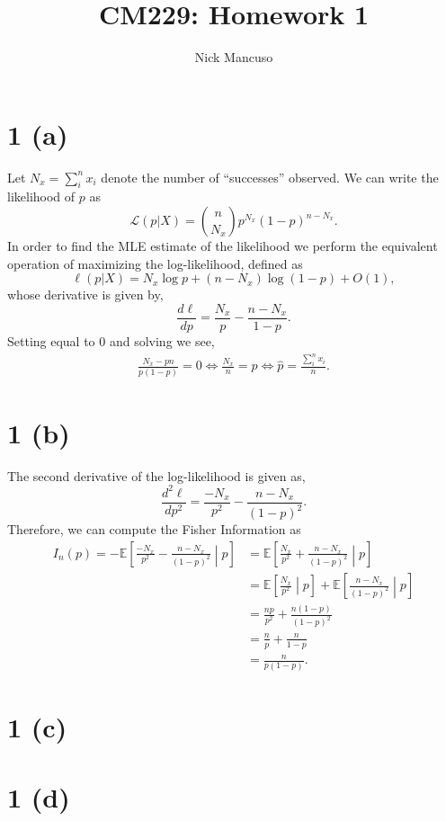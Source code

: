 \documentclass[10pt]{article}
\def\E{\mathbb{E}}
\begin{document}
\title{CM229: Homework 1}
\author{Nick Mancuso}
\maketitle

\section*{1 (a)}
Let $N_x = \sum_i^n x_i$ denote the number of ``successes'' observed. We can write the
likelihood of $p$ as \[ \mathcal{L}(p| X) = {n \choose N_x} p^{N_x} (1 - p)^{n - N_x}.\] In order
to find the MLE estimate of the likelihood we perform the equivalent operation of maximizing the
log-likelihood, defined as \[\ell(p | X) = N_x \log p + (n - N_x) \log (1 - p) + O(1),\] whose
derivative is given by, \[ \frac{d \ell}{d p} = \frac{N_x}{p} - \frac{n - N_x}{1 - p}.\] Setting
equal to 0 and solving we see,
\begin{align*}
    \frac{N_x - pn}{p(1 - p)} = 0 \Leftrightarrow 
    \frac{N_x}{n} = p \Leftrightarrow 
    \hat{p} = \frac{\sum_i^n x_i}{n}.
\end{align*}

\section*{1 (b)}
The second derivative of the log-likelihood is given as, 
\[ \frac{d^2 \ell}{d p^2} = \frac{-N_x}{p^2} - \frac{n - N_x}{(1 - p)^2}.\] Therefore, we can
compute the Fisher Information as
\begin{align*}
    I_n(p) = -\E\left[\frac{-N_x}{p^2} - \frac{n - N_x}{(1 - p)^2} \middle\rvert p \right] &= 
    \E\left[\frac{N_x}{p^2} + \frac{n - N_x}{(1 - p)^2} \middle\rvert p \right]\\
    &= \E\left[\frac{N_x}{p^2} \middle\rvert p\right] + \E\left[\frac{n - N_x}{(1 - p)^2} \middle\rvert p \right] \\
    &= \frac{n p}{p^2} + \frac{n (1 - p)}{(1 - p)^2}\\
    &= \frac{n}{p} + \frac{n}{1 - p} \\
    &= \frac{n}{p(1 - p)}.
\end{align*}
\section*{1 (c)}
\section*{1 (d)}
\end{document}

